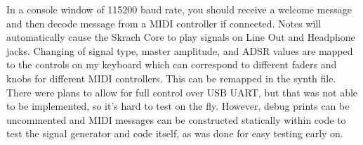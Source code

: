 \documentclass[12pt]{article}
\begin{document}
In a console window of 115200 baud rate, you should receive a welcome message and then decode message from a MIDI controller if connected. Notes will automatically cause the Skrach Core to play signals on Line Out and Headphone jacks. Changing of signal type, master amplitude, and ADSR values are mapped to the controls on my keyboard which can correspond to different faders and knobs for different MIDI controllers. This can be remapped in the synth file. There were plans to allow for full control over USB UART, but that was not able to be implemented, so it's hard to test on the fly. However, debug prints can be uncommented and MIDI messages can be constructed statically within code to test the signal generator and code itself, as was done for easy testing early on.

\printbibliography[heading=bibintoc]
\end{document}
